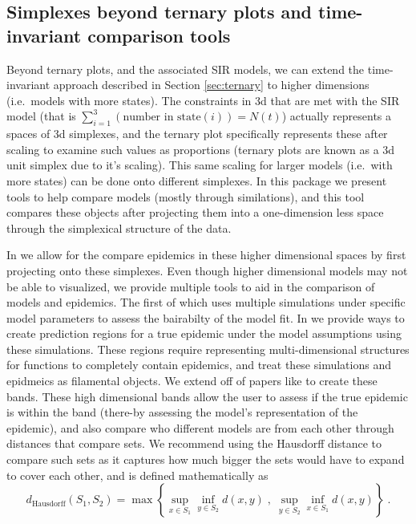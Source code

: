\documentclass[
  shortnames]{jss}
\begin{document}
\subsection[Simplexes beyond ternary plots]{Simplexes beyond ternary
plots and time-invariant comparison
tools}\label{sec:time-invariant-in-simplex}

Beyond ternary plots, and the associated SIR models, we can extend the
time-invariant approach described in Section \ref{sec:ternary} to higher
dimensions (i.e.~models with more states). The constraints in 3d that
are met with the SIR model (that is
\(\sum_{i=1}^3 (\text{number in state}(i)) = N(t)\)) actually represents
a spaces of 3d simplexes, and the ternary plot specifically represents
these after scaling to examine such values as proportions (ternary plots
are known as a 3d unit simplex due to it's scaling). This same scaling
for larger models (i.e.~with more states) can be done onto different
simplexes. In this package we present tools to help compare models
(mostly through similations), and this tool compares these objects after
projecting them into a one-dimension less space through the simplexical
structure of the data.

In  we allow for the compare epidemics in these higher
dimensional spaces by first projecting onto these simplexes. Even though
higher dimensional models may not be able to visualized, we provide
multiple tools to aid in the comparison of models and epidemics. The
first of which uses multiple simulations under specific model parameters
to assess the bairabilty of the model fit. In  we
provide ways to create prediction regions for a true epidemic under the
model assumptions using these simulations. These regions require
representing multi-dimensional structures for functions to completely
contain epidemics, and treat these simulations and epidmeics as
filamental objects. We extend off of papers like \citet{Dalmasso2019a}
to create these bands. These high dimensional bands allow the user to
assess if the true epidemic is within the band (there-by assessing the
model's representation of the epidemic), and also compare who different
models are from each other through distances that compare sets. We
recommend using the Hausdorff distance to compare such sets as it
captures how much bigger the sets would have to expand to cover each
other, and is defined mathematically as \[
d_\text{Hausdorff}(S_1, S_2) = \max \left\{ \sup_{x \in S_1} \inf_{y \in S_2} d(x,y) \;,\; \sup_{y \in S_2} \inf_{x \in S_1} d(x,y)\right\}\;.
\]
\end{document}
